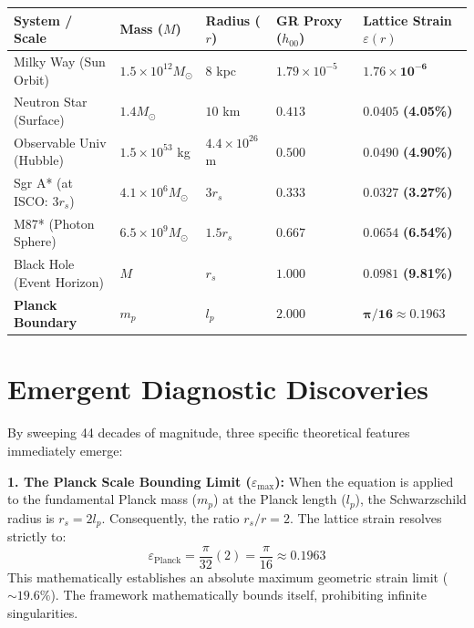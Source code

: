 \documentclass[11pt, letterpaper, openany]{book}
\begin{document}
\begin{center}
\renewcommand{\arraystretch}{1.2}
\small
\begin{tabular}{|p{3.5cm}|p{2cm}|p{2.5cm}|p{2.2cm}|p{2.5cm}|}
\hline
\rowcolor{kishblue!12}
\textbf{System / Scale} & \textbf{Mass ($M$)} & \textbf{Radius ($r$)} & \textbf{GR Proxy ($h_{00}$)} & \textbf{Lattice Strain $\varepsilon(r)$} \\
\hline
Milky Way (Sun Orbit) & $1.5 \times 10^{12} M_\odot$ & $8$ kpc & $1.79 \times 10^{-5}$ & $\mathbf{1.76 \times 10^{-6}}$ \\
\hline
Neutron Star (Surface) & $1.4 M_\odot$ & $10$ km & $0.413$ & $\mathbf{0.0405}$ \textbf{(4.05\%)} \\
\hline
Observable Univ (Hubble) & $1.5 \times 10^{53}$ kg & $4.4 \times 10^{26}$ m & $0.500$ & $\mathbf{0.0490}$ \textbf{(4.90\%)} \\
\hline
Sgr A* (at ISCO: $3 r_s$) & $4.1 \times 10^6 M_\odot$ & $3 r_s$ & $0.333$ & $\mathbf{0.0327}$ \textbf{(3.27\%)} \\
\hline
M87* (Photon Sphere) & $6.5 \times 10^9 M_\odot$ & $1.5 r_s$ & $0.667$ & $\mathbf{0.0654}$ \textbf{(6.54\%)} \\
\hline
Black Hole (Event Horizon) & $M$ & $r_s$ & $1.000$ & $\mathbf{0.0981}$ \textbf{(9.81\%)} \\
\hline
\rowcolor{goldseal!20}
\textbf{Planck Boundary} & $m_p$ & $l_p$ & $2.000$ & $\mathbf{\pi/16 \approx 0.1963}$ \\
\hline
\end{tabular}
\end{center}

\section{Emergent Diagnostic Discoveries}

By sweeping 44 decades of magnitude, three specific theoretical features immediately emerge:

\textbf{1. The Planck Scale Bounding Limit ($\varepsilon_{\text{max}}$):}
When the equation is applied to the fundamental Planck mass ($m_p$) at the Planck length ($l_p$), the Schwarzschild radius is $r_s = 2 l_p$. Consequently, the ratio $r_s/r = 2$. 
The lattice strain resolves strictly to:
\[
\varepsilon_{\text{Planck}} = \frac{\pi}{32} (2) = \frac{\pi}{16} \approx 0.1963
\]
This mathematically establishes an absolute maximum geometric strain limit ($\sim 19.6\%$). The framework mathematically bounds itself, prohibiting infinite singularities. 
\end{document}
